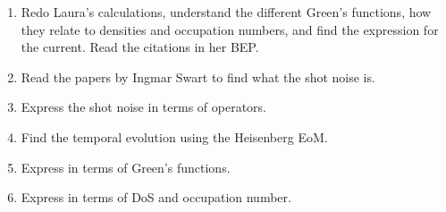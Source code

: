 \begin{tcolorbox}[title = Roadmap, colback = red!7!white, colbacktitle = red!95!black]
    \begin{enumerate}
        \item Redo Laura's calculations, understand the different Green's functions, how they relate to densities and occupation numbers, and find the expression for the current. Read the citations in her BEP.
        \item Read the papers by Ingmar Swart to find what the shot noise is.
        \item Express the shot noise in terms of operators.
        \item Find the temporal evolution using the Heisenberg EoM.
        \item Express in terms of Green's functions.
        \item Express in terms of DoS and occupation number.
    \end{enumerate}
\end{tcolorbox}

